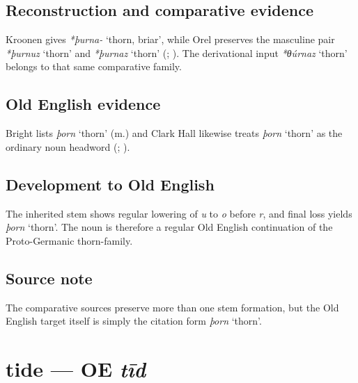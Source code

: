 \documentclass[
  british,
  a4paper,
  openany]{book}
\providecommand{\Recon}[1]{\emph{*#1}}
{\catcode`→=\active \global\def→{\ensuremath{\rightarrow}}}
\providecommand{\texorpdfstring}[2]{#1}
\providecommand{\Recon}[1]{\emph{*#1}}
{\catcode`→=\active \global\def→{\ensuremath{\rightarrow}}}
\begin{document}
\subsection{Reconstruction and comparative
evidence}\label{reconstruction-and-comparative-evidence-56}

Kroonen gives \emph{*þurna-} `thorn, briar', while Orel preserves the
masculine pair \Recon{þurnuz} `thorn' and \Recon{þurnaz} `thorn'
(; ). The derivational input \Recon{θúrnaz} `thorn' belongs to that
same comparative family.

\subsection{Old English evidence}\label{old-english-evidence-56}

Bright lists \emph{þorn} `thorn' (m.) and Clark Hall likewise treats
\emph{þorn} `thorn' as the ordinary noun headword
(;
).

\subsection{Development to Old
English}\label{development-to-old-english-56}

The inherited stem shows regular lowering of \emph{u} to \emph{o} before
\emph{r}, and final loss yields \emph{þorn} `thorn'. The noun is
therefore a regular Old English continuation of the Proto-Germanic
thorn-family.

\subsection{Source note}\label{source-note-5}

The comparative sources preserve more than one stem formation, but the
Old English target itself is simply the citation form \emph{þorn}
`thorn'.

\section{\texorpdfstring{tide --- OE
\emph{tīd}}{tide --- OE tīd}}\label{tide-oe-tux12bd}

\end{document}
